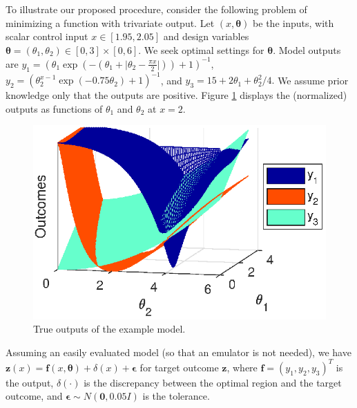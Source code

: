 \documentclass[12pt]{article}
\begin{document}
%
To illustrate our proposed procedure, consider the following problem of minimizing a function with trivariate output. 
%
Let $(x,\boldsymbol \theta)$ be the inputs, with scalar control input $x\in[1.95,2.05]$ and design variables $\boldsymbol \theta = (\theta_1,\theta_2)\in[0,3]\times[0,6]$.
%
We seek optimal settings for $\boldsymbol\theta$.
%
Model outputs are
%
$
y_1 = \left(\theta_1 \exp\left(-\left(\theta_1 + \lvert \theta_2-\frac{\pi x}2\rvert \right)\right)+1\right)^{-1}$, 
$
y_2 = \left(\theta_2^{x-1} \exp\left(-0.75 \theta_2\right) + 1 \right)^{-1}
$, and
$
y_3 = 15 + 2 \theta_1 + {\theta_2^2}/4.
$
%
We assume prior knowledge only that the outputs are positive.
%
Figure \ref{fig:toy_sim_outputs} displays the (normalized) outputs as functions of $\theta_1$ and $\theta_2$ at $x = 2$.
%
\begin{figure}
\centering
\includegraphics[scale=.8]{FIG_toy_sim_model_outputs.eps}
\caption{True outputs of the example model.}
\label{fig:toy_sim_outputs}
\end{figure}
%
Assuming an easily evaluated model (so that an emulator is not needed), we have
%
$
\mathbf z(x) = \mathbf f(x,\boldsymbol \theta) + \delta(x) + \boldsymbol\epsilon
$
%
for target outcome $\mathbf z$, where $\mathbf f = (y_1,y_2,y_3)^T$ is the output, $\delta(\cdot)$ is the discrepancy between the optimal region and the target outcome, and $\boldsymbol \epsilon\sim N(\mathbf 0,0.05I)$ is the tolerance.
%
%
\end{document}
